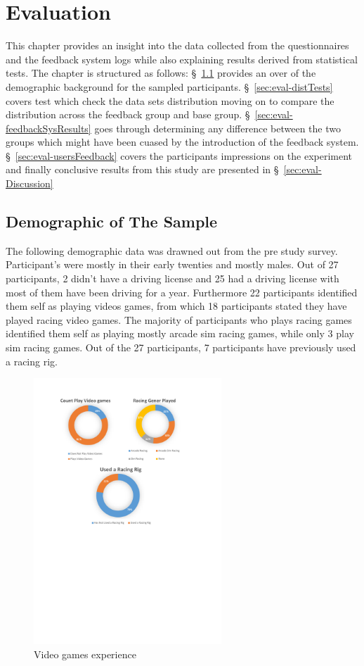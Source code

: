 \section{Evaluation}
This chapter provides an insight into the data collected from the questionnaires and the feedback system logs while also explaining results derived from statistical tests. The chapter is structured as follows: \S~\ref{sec:eval-demographic} provides an over of the demographic background for the sampled participants. \S~\ref{sec:eval-distTests} covers test which check the data sets distribution moving on to compare the distribution across the feedback group and base group. \S~\ref{sec:eval-feedbackSysResults} goes through determining any difference between the two groups which might have been cuased by the introduction of the feedback system.  \S~\ref{sec:eval-usersFeedback} covers the participants impressions on the experiment and finally conclusive results from this study are presented in \S~\ref{sec:eval-Discussion} 

\subsection{Demographic of The Sample}
\label{sec:eval-demographic}

The following demographic data was drawned out from the pre study survey. Participant's were mostly in their early twenties and mostly males. Out of 27 participants, 2 didn't have a driving license and 25 had a driving license with most of them have been driving for a year. Furthermore 22 participants identified them self as playing videos games, from which 18 participants stated they have played racing video games. The majority of participants who plays racing games identified them self as playing mostly arcade sim racing games, while only 3 play sim racing games. Out of the 27 participants, 7 participants have previously used a racing rig.


\begin{figure}[!htb]
	\centering
	\includegraphics[height=10cm]{charts/gamesxp.pdf}
	\caption[Gaming xp]{Video games experience}
	\label{fig:chart-gamesxp}
\end{figure}

